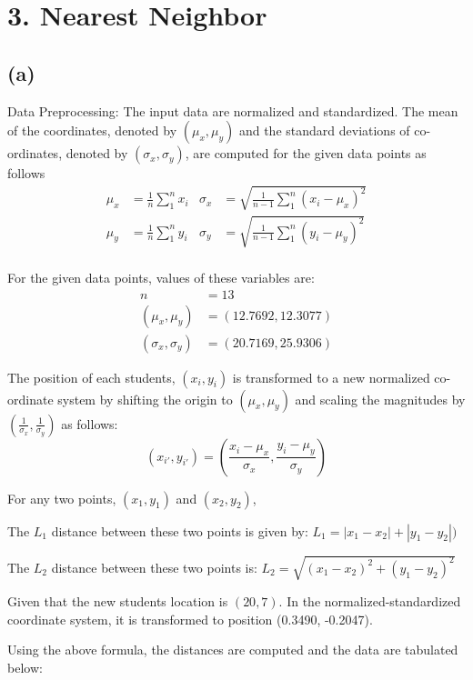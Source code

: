\documentclass[letterpaper,doc,notimes]{apa6}
\begin{document}
\section{3. Nearest Neighbor}

\subsection{(a)}

Data Preprocessing:
	The input data are normalized and standardized. The mean of the coordinates, denoted by $(\mu_x, \mu_y)$ and the standard deviations of co-ordinates, denoted by $(\sigma_x, \sigma_y)$, are computed for the given data points as follows 
	\begin{align*}
		\mu_x & = \frac{1}{n}\sum_{1}^{n} x_i   &  \sigma_x &= \sqrt{ \frac{1}{n-1} \sum_{1}^{n} (x_i - \mu_x)^2 } \\
		\mu_y & = \frac{1}{n}\sum_{1}^{n} y_i   &  \sigma_y &= \sqrt{\frac{1}{n-1} \sum_{1}^{n} (y_i - \mu_y)^2 }\\
	\end{align*}

For the given data points, values of these variables are:
	\begin{align*}
		n &= 13  \\
		(\mu_x, \mu_y )& = (12.7692, 12.3077)  \\
		(\sigma_x, \sigma_y) &= (20.7169, 25.9306)
	\end{align*}

The position of each students, $(x_i, y_i)$ is transformed to a new normalized co-ordinate system by shifting the origin to $(\mu_x, \mu_y)$ and scaling the magnitudes by $(\frac{1}{\sigma_x},   \frac{1}{\sigma_y})$ as follows:
\begin{equation*}
	(x_{i'}, y_{i'}) =  (\frac{x_i - \mu_x}{\sigma_x}, \frac{y_i - \mu_y}{\sigma_y})
\end{equation*}


For any two points, $(x_1, y_1)$ and $(x_2, y_2)$,


The $L_1$ distance between these two points is given by:
$L_1 = |x_1 - x_2| + |y_1 - y_2|)$ 

The $L_2$ distance between these two points is:
$L_2 = \sqrt{(x_1 - x_2)^2 + (y_1 - y_2)^2}$

Given that the new students location is $ (20, 7)$. 
In the normalized-standardized coordinate system, it is transformed to position (0.3490, -0.2047).

Using the above formula, the distances are computed and the data are tabulated below:
\end{document}
